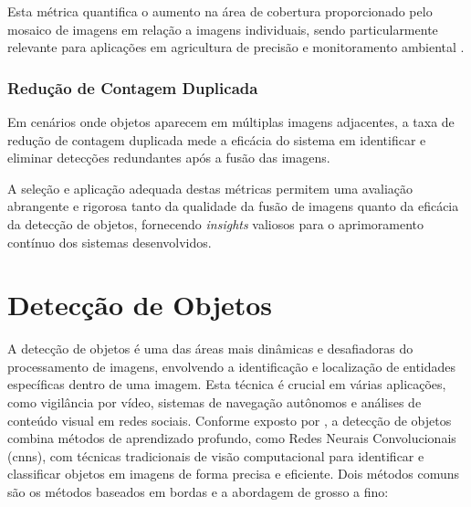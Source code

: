 Esta métrica quantifica o aumento na área de cobertura proporcionado pelo mosaico de imagens em relação a imagens individuais, sendo particularmente relevante para aplicações em agricultura de precisão e monitoramento ambiental \cite{kentsch2020applications}.

\subsubsection{Redução de Contagem Duplicada}

Em cenários onde objetos aparecem em múltiplas imagens adjacentes, a taxa de redução de contagem duplicada mede a eficácia do sistema em identificar e eliminar detecções redundantes após a fusão das imagens.

A seleção e aplicação adequada destas métricas permitem uma avaliação abrangente e rigorosa tanto da qualidade da fusão de imagens quanto da eficácia da detecção de objetos, fornecendo \textit{insights} valiosos para o aprimoramento contínuo dos sistemas desenvolvidos.




\section{Detecção de Objetos}\label{sec:deteccao}

A detecção de objetos é uma das áreas mais dinâmicas e desafiadoras do processamento de imagens, envolvendo a identificação e localização de entidades específicas dentro de uma imagem. Esta técnica é crucial em várias aplicações, como vigilância por vídeo, sistemas de navegação autônomos e análises de conteúdo visual em redes sociais. Conforme exposto por \cite{zhao2019object}, a detecção de objetos combina métodos de aprendizado profundo, como Redes Neurais Convolucionais (\gls{cnn}s), com técnicas tradicionais de visão computacional para identificar e classificar objetos em imagens de forma precisa e eficiente. Dois métodos comuns são os métodos baseados em bordas e a abordagem de grosso a fino:

